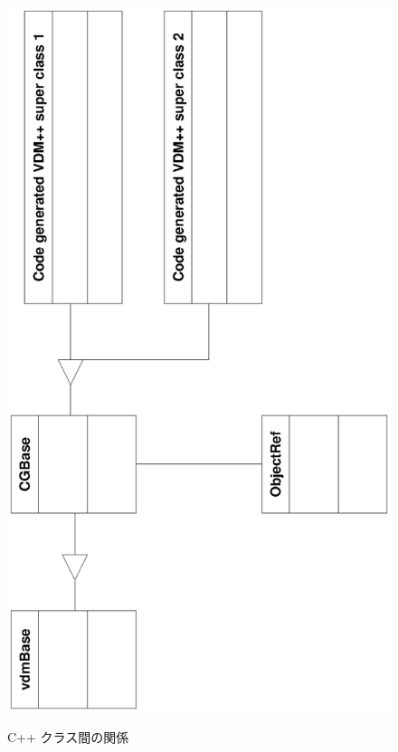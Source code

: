 \documentclass[\pformat,12pt]{jarticle}
\def\insertfig#1#2#3#4{ %
\begin{figure}[htb]
\begin{center}
\resizebox{#2}{!}{\texttt{[image: \#1]}}
\end{center}
\caption{#3} #4
\end{figure} 
}
\begin{document}
\begin{figure}[hbt]
  \begin{center}
    \scalebox{.7}
    {
    {\includegraphics{cgbase}}}
    \caption{C++ クラス間の関係 \label{fig:cgb}}
  \end{center}
\end{figure}


\end{document}
